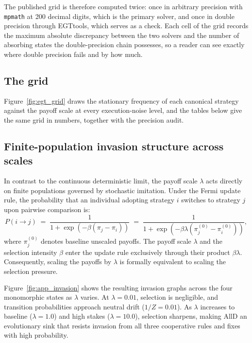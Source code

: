 \documentclass[11pt,a4paper]{article}
\newcommand{\lam}{\lambda}
\begin{document}
The published grid is therefore computed twice: once in arbitrary precision with \texttt{mpmath} at 200 decimal digits, which is the primary solver, and once in double precision through EGTtools, which serves as a check. Each cell of the grid records the maximum absolute discrepancy between the two solvers and the number of absorbing states the double-precision chain possesses, so a reader can see exactly where double precision fails and by how much.

\subsection{The grid}\label{appendix:egt_grid}

Figure~\ref{fig:egt_grid} draws the stationary frequency of each canonical strategy against the payoff scale at every execution-noise level, and the tables below give the same grid in numbers, together with the precision audit.

\subsection{Finite-population invasion structure across scales}\label{appendix:egt_invasion}

In contrast to the continuous deterministic limit, the payoff scale $\lam$ acts directly on finite populations governed by stochastic imitation. Under the Fermi update rule, the probability that an individual adopting strategy $i$ switches to strategy $j$ upon pairwise comparison is:
\begin{equation}
P(i \to j) \;=\; \frac{1}{1 + \exp\left(-\beta (\pi_j - \pi_i)\right)}
\;=\; \frac{1}{1 + \exp\left(-\beta \lam (\pi_j^{(0)} - \pi_i^{(0)})\right)},
\label{eq:fermi_scaling}
\end{equation}
where $\pi_j^{(0)}$ denotes baseline unscaled payoffs. The payoff scale $\lam$ and the selection intensity $\beta$ enter the update rule exclusively through their product $\beta \lam$. Consequently, scaling the payoffs by $\lam$ is formally equivalent to scaling the selection pressure.

Figure~\ref{fig:app_invasion} shows the resulting invasion graphs across the four monomorphic states as $\lam$ varies. At $\lam = 0.01$, selection is negligible, and transition probabilities approach neutral drift ($1/Z = 0.01$). As $\lam$ increases to baseline ($\lam = 1.0$) and high stakes ($\lam = 10.0$), selection sharpens, making AllD an evolutionary sink that resists invasion from all three cooperative rules and fixes with high probability.
\end{document}
